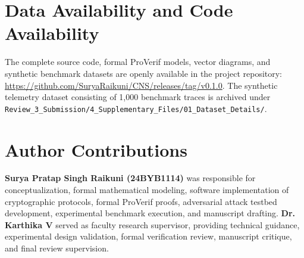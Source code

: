 \documentclass[journal,10pt,twocolumn]{IEEEtran}
\begin{document}
\section{Data Availability and Code Availability}
The complete source code, formal ProVerif models, vector diagrams, and synthetic benchmark datasets are openly available in the project repository: \url{https://github.com/SuryaRaikuni/CNS/releases/tag/v0.1.0}. The synthetic telemetry dataset consisting of 1,000 benchmark traces is archived under \texttt{Review\_3\_Submission/4\_Supplementary\_Files/01\_Dataset\_Details/}.

\section{Author Contributions}
\textbf{Surya Pratap Singh Raikuni (24BYB1114)} was responsible for conceptualization, formal mathematical modeling, software implementation of cryptographic protocols, formal ProVerif proofs, adversarial attack testbed development, experimental benchmark execution, and manuscript drafting. \textbf{Dr. Karthika V} served as faculty research supervisor, providing technical guidance, experimental design validation, formal verification review, manuscript critique, and final review supervision.



\end{document}
